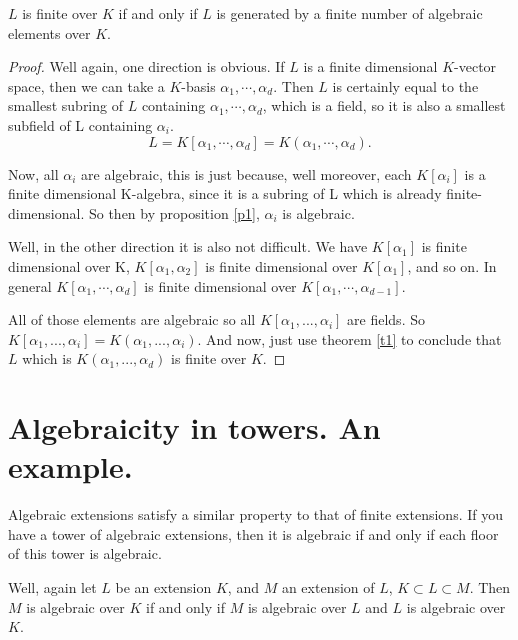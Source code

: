 \begin{theorem}
$L$ is finite over $K$ if and only if $L$ is generated by a finite number of algebraic elements over $K$.
\end{theorem}
\begin{proof}
Well again, one direction is obvious. If $L$ is a finite dimensional $K$-vector space, then we can take a $K$-basis $\alpha_1, \cdots, \alpha_d$. Then $L$ is certainly equal to the smallest subring of $L$ containing $\alpha_1,\cdots, \alpha_d$, which is a field, so it is also a smallest subfield of L containing $\alpha_i$. 
\begin{equation}
L=K[\alpha_1,\cdots, \alpha_d]=K(\alpha_1,\cdots, \alpha_d).
\end{equation}

Now, all $\alpha_i$ are algebraic, this is just because, well moreover, each $K[\alpha_i]$ is a finite dimensional K-algebra, since it is a subring of L which is already finite-dimensional. So then by proposition \ref{p1}, $\alpha_i$ is algebraic. 

Well, in the other direction it is also not difficult. We have $K[\alpha_1]$ is finite dimensional over K, $K[\alpha_1, \alpha_2]$ is finite dimensional over $K[\alpha_1]$, and so on. In general $K[\alpha_1, \cdots, \alpha_d]$ is finite dimensional over $K[\alpha_1, \cdots, \alpha_{d-1}]$. 

All of those elements are algebraic so all $K[\alpha_1, ..., \alpha_i]$ are fields.
So $K[\alpha_1, ..., \alpha_i]=K(\alpha_1, ..., \alpha_i)$. And now, just use theorem \ref{t1} to conclude that $L$ which is $K(\alpha_1, ..., \alpha_d)$ is finite over $K$.
\end{proof}

\section{Algebraicity in towers. An example.}
Algebraic extensions satisfy a similar property to that of finite extensions. If you have a tower of algebraic extensions, then it is algebraic if and only if  each floor of this tower is algebraic. 

\begin{theorem}
\label{t2}
Well, again let $L$ be an extension $K$, and $M$ an extension of $L$, $K\subset L\subset M$. Then $M$ is algebraic over $K$ if and only if $M$ is algebraic over $L$ and $L$ is algebraic over $K$.
\end{theorem}

